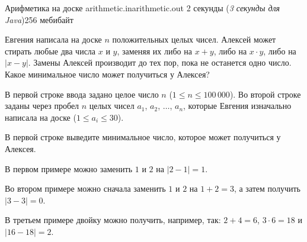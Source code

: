 \gdef\thisproblemauthor{Иван Казменко}
\gdef\thisproblemdeveloper{Иван Казменко}
\begin{problem}{Арифметика на доске}
{arithmetic.in}{arithmetic.out}
{2 секунды (\textsl{3 секунды для Java})}{256 мебибайт}{}

Евгения написала на доске $n$ положительных целых чисел.
Алексей может стирать любые два числа $x$ и $y$,
заменяя их либо на $x + y$, либо на $x \cdot y$, либо на $|x - y|$.
Замены Алексей производит до тех пор, пока не останется одно число.
Какое минимальное число может получиться у Алексея?

\InputFile

В первой строке ввода задано целое число $n$
($1 \le n \le 100\,000$).
Во второй строке заданы через пробел $n$ целых чисел
$a_1$, $a_2$, $\ldots$, $a_n$, которые Евгения изначально написала на доске
($1 \le a_i \le 30$).

\OutputFile

В первой строке выведите минимальное число, которое может получиться у Алексея.

\Examples

\begin{example}
%
%
%
\end{example}

\Explanations

В первом примере можно заменить $1$ и $2$ на $|2 - 1| = 1$.

Во втором примере можно сначала заменить $1$ и $2$ на $1 + 2 = 3$,
а затем получить $|3 - 3| = 0$.

В третьем примере двойку можно получить, например, так:
$2 + 4 = 6$, $3 \cdot 6 = 18$ и $|16 - 18| = 2$.

\end{problem}
